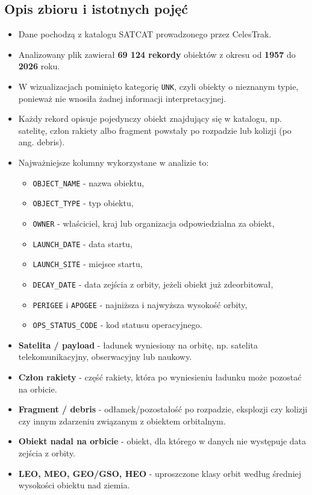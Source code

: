 \documentclass[12pt]{article}
\begin{document}
\subsection{Opis zbioru i istotnych pojęć}
\begin{itemize}
    \item Dane pochodzą z katalogu SATCAT prowadzonego przez CelesTrak.
    \item Analizowany plik zawierał \textbf{69 124 rekordy} obiektów z okresu od \textbf{1957} do \textbf{2026} roku.
    \item W wizualizacjach pominięto kategorię \texttt{UNK}, czyli obiekty o nieznanym typie, ponieważ nie wnosiła żadnej informacji interpretacyjnej.
    \item Każdy rekord opisuje pojedynczy obiekt znajdujący się w katalogu, np. satelitę, człon rakiety albo fragment powstały po rozpadzie lub kolizji (po ang. debris).
    \item Najważniejsze kolumny wykorzystane w analizie to:
    \begin{itemize}
        \item \texttt{OBJECT\_NAME} - nazwa obiektu,
        \item \texttt{OBJECT\_TYPE} - typ obiektu,
        \item \texttt{OWNER} - właściciel, kraj lub organizacja odpowiedzialna za obiekt,
        \item \texttt{LAUNCH\_DATE} - data startu,
        \item \texttt{LAUNCH\_SITE} - miejsce startu,
        \item \texttt{DECAY\_DATE} - data zejścia z orbity, jeżeli obiekt już zdeorbitował,
        \item \texttt{PERIGEE} i \texttt{APOGEE} - najniższa i najwyższa wysokość orbity,
        \item \texttt{OPS\_STATUS\_CODE} - kod statusu operacyjnego.
    \end{itemize}
    \item \textbf{Satelita / payload} - ładunek wyniesiony na orbitę, np. satelita telekomunikacyjny, obserwacyjny lub naukowy.
    \item \textbf{Człon rakiety} - część rakiety, która po wyniesieniu ładunku może pozostać na orbicie.
    \item \textbf{Fragment / debris} - odłamek/pozostałość po rozpadzie, eksplozji czy kolizji czy innym zdarzeniu związanym z obiektem orbitalnym.
    \item \textbf{Obiekt nadal na orbicie} - obiekt, dla którego w danych nie występuje data zejścia z orbity.
    \item \textbf{LEO, MEO, GEO/GSO, HEO} - uproszczone klasy orbit według średniej wysokości obiektu nad ziemia.
\end{itemize}
\end{document}
